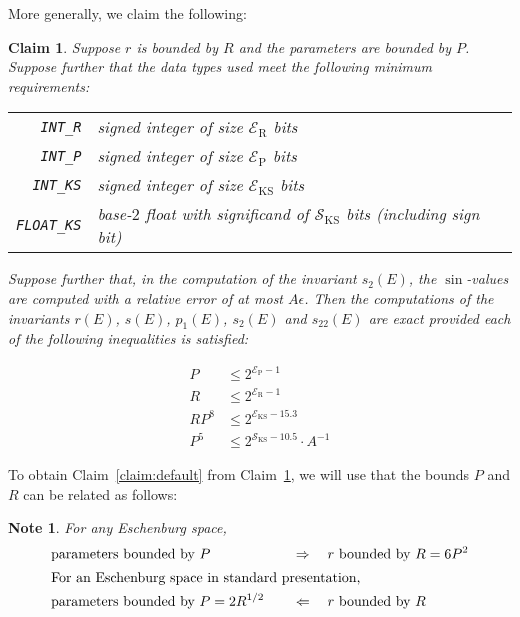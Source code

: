 \documentclass{article}
\newtheorem{note}{Note}
\newtheorem{claim}{Claim}
\newcommand{\macheps}{\epsilon} %
\newcommand{\expP}{\mathcal E_{\text{P}}}
\newcommand{\expR}{\mathcal E_{\text{R}}}
\newcommand{\expKS}{\mathcal E_{\text{KS}}}
\newcommand{\sigKS}{\mathcal S_{\text{KS}}}
\begin{document}
More generally, we claim the following:
\begin{claim}\label{claim:bits}
  Suppose \(r\) is bounded by \(R\) and the parameters are bounded by \(P\).
  Suppose further that the data types used meet the following minimum requirements:
  
  \begin{tabular}{rp{\linewidth-5em}}
    \verb+INT_R+ & signed integer of size \(\expR\) bits \\
    \verb+INT_P+ & signed integer of size \(\expP\) bits \\
    \verb+INT_KS+ & signed integer of size \(\expKS\) bits \\
    \verb+FLOAT_KS+ & base-\(2\) float with significand of \(\sigKS\) bits (including sign bit)
  \end{tabular}
  
  Suppose further that, in the computation of the invariant \(s_{2}(E)\), the \(\sin\)-values are computed with a relative error of at most \(A\macheps\).
  Then the computations of the invariants \(r(E)\), \(s(E)\), \(p_1(E)\), \(s_2(E)\) and \(s_{22}(E)\)
  are exact provided each of the following inequalities is satisfied:
  \begin{multicols}{2}
    \noindent\allowdisplaybreaks
  \begin{align*}
    P & \leq 2^{\expP-1}  \label{eq:bits:PeP}\tag{$a$}          \\
    R    & \leq 2^{\expR-1}  \label{eq:bits:ReR}\tag{$b$}      \\
    RP^8 & \leq 2^{\expKS-15.3} \label{eq:bits:PeKS} \tag{$c$}   \\
    P^5  & \leq 2^{\sigKS-10.5}\label{eq:bits:PsKS}·A^{-1} \tag{$d$}
  \end{align*}
  \end{multicols}
\end{claim}

To obtain Claim~\ref{claim:default} from Claim~\ref{claim:bits}, we will use that the bounds \(P\) and \(R\) can be related as follows:
\begin{note}\label{lem:P-vs-R}
  For any Eschenburg space, 
  \begin{alignat*}{7}
    &\text{parameters bounded by } P &&\quad\Rightarrow\quad r \text{ bounded by } R = 6 P^2\\
    \intertext{%
    For an Eschenburg space in standard presentation,}
    &\text{parameters bounded by } P = 2R^{1/2} &&\quad\Leftarrow\quad r \text{ bounded by } R 
  \end{alignat*}
\end{note}
\end{document}
